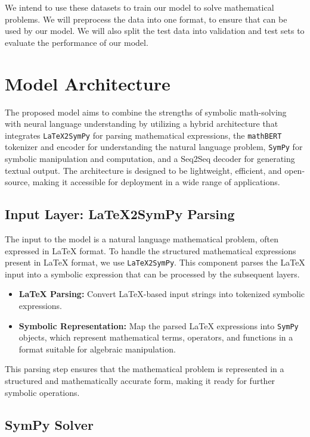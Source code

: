 \documentclass{article}
\begin{document}
We intend to use these datasets to train our model to solve mathematical problems. We will preprocess the data into one format, to ensure that can be used by our model. We will also split the test data into validation and test sets to evaluate the performance of our model.

\section{Model Architecture}

The proposed model aims to combine the strengths of symbolic math-solving with neural language understanding by utilizing a hybrid architecture that integrates \texttt{LaTeX2SymPy} for parsing mathematical expressions, the \texttt{mathBERT} tokenizer and encoder for understanding the natural language problem, \texttt{SymPy} for symbolic manipulation and computation, and a Seq2Seq decoder for generating textual output. The architecture is designed to be lightweight, efficient, and open-source, making it accessible for deployment in a wide range of applications.

\subsection{Input Layer: LaTeX2SymPy Parsing}

The input to the model is a natural language mathematical problem, often expressed in LaTeX format. To handle the structured mathematical expressions present in LaTeX format, we use \texttt{LaTeX2SymPy}. This component parses the LaTeX input into a symbolic expression that can be processed by the subsequent layers.

\begin{itemize}
    \item \textbf{LaTeX Parsing:} Convert LaTeX-based input strings into tokenized symbolic expressions.
    \item \textbf{Symbolic Representation:} Map the parsed LaTeX expressions into \texttt{SymPy} objects, which represent mathematical terms, operators, and functions in a format suitable for algebraic manipulation.
\end{itemize}

This parsing step ensures that the mathematical problem is represented in a structured and mathematically accurate form, making it ready for further symbolic operations.

\subsection{SymPy Solver}
\end{document}
